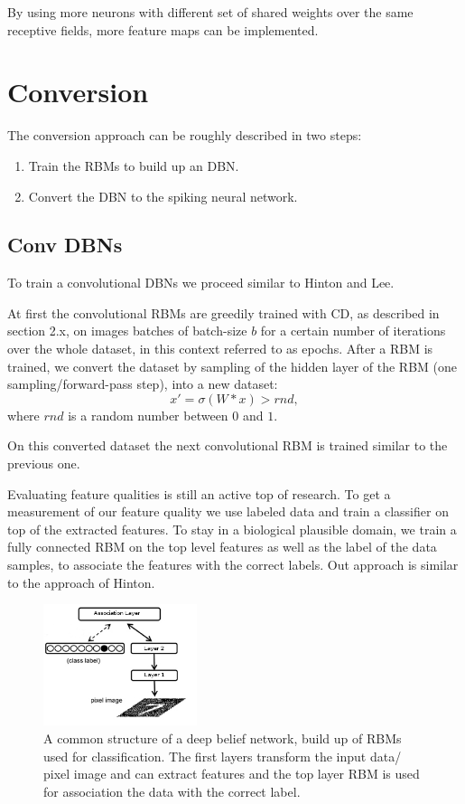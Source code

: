 By using more neurons with different set of shared weights over the same receptive fields, more feature maps can be implemented.     

\section{Conversion}

The conversion approach can be roughly described in two steps:
\begin{enumerate}
\item Train the RBMs to build up an DBN.
\item Convert the DBN to the spiking neural network.
\end{enumerate}


\subsection{Conv DBNs}

To train a convolutional DBNs we proceed similar to Hinton and Lee.

At first the convolutional RBMs are greedily trained with CD, as described in section 2.x, on images batches of batch-size $b$ for a certain number of iterations over the whole dataset, in this context referred to as epochs.
After a RBM is trained, we convert the dataset by sampling of the hidden layer of the RBM (one sampling/forward-pass step), into a new dataset:
\[
x' = \sigma(W * x) > rnd,
\]
where $rnd$ is a random number between $0$ and $1$.

On this converted dataset the next convolutional RBM is trained similar to the previous one.

Evaluating feature qualities is still an active top of research.
To get a measurement of our feature quality we use labeled data and train a classifier on top of the extracted features.
To stay in a biological plausible domain, we train a fully connected RBM on the top level features as well as the label of the data samples, to associate the features with the correct labels.
Out approach is similar to the approach of Hinton.

\begin{figure}
	\centering
    	\includegraphics[width=0.4\textwidth]{imgs/dbn_mnist.png} 
    \caption{A common structure of a deep belief network, build up of RBMs used for classification. The first layers transform the input data/ pixel image and can extract features and the top layer RBM is used for association the data with the correct label.}
	\label{fig:dbnmnist}
\end{figure}

